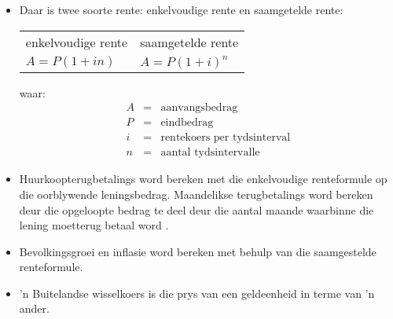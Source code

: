 
\begin{itemize}
    \item Daar is twee soorte rente: enkelvoudige rente en saamgetelde rente:\\
    
    \begin{tabularx}{\textwidth}{ XX }
	enkelvoudige rente	&	saamgetelde rente\\
	$A = P (1 + in)$	&	$A = P(1 + i)^n$\\
    \end{tabularx}
    \par
    waar:
    \begin{eqnarray*}
	A &=& \mbox{aanvangsbedrag}\\
	P &=& \mbox{eindbedrag}\\
	i &=& \mbox{rentekoers per tydsinterval}\\
	n &=& \mbox{aantal tydsintervalle}
    \end{eqnarray*}

    \item Huurkoopterugbetalings word bereken met die enkelvoudige renteformule op die oorblywende leningsbedrag. Maandelikse terugbetalings word bereken deur die opgeloopte bedrag te deel deur die aantal maande waarbinne die lening moetterug betaal word .

    \item Bevolkingsgroei en inflasie word bereken met behulp van die saamgestelde renteformule.

    \item ’n Buitelandse wisselkoers is die prys van een geldeenheid in terme van ’n ander.
\end{itemize}



